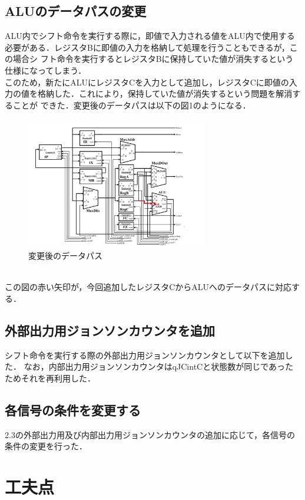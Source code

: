 \documentclass[dvipdfmx]{jarticle}
\begin{document}
\subsection{ALUのデータパスの変更}
ALU内でシフト命令を実行する際に，即値で入力される値をALU内で使用する必要がある．レジスタBに即値の入力を格納して処理を行うこともできるが，この場合シ
フト命令を実行するとレジスタBに保持していた値が消失するという仕様になってしまう．\\
このため，新たにALUにレジスタCを入力として追加し，レジスタCに即値の入力の値を格納した．これにより，保持していた値が消失するという問題を解消することが
できた．変更後のデータパスは以下の図1のようになる．
\begin{figure}[h]
  \centering
  \includegraphics[width = 8cm]{improvedatapath.png}
  \caption{変更後のデータパス}
\end{figure}
\\この図の赤い矢印が，今回追加したレジスタCからALUへのデータパスに対応する．
\subsection{外部出力用ジョンソンカウンタを追加}
シフト命令を実行する際の外部出力用ジョンソンカウンタとして以下を追加した．
なお，内部出力用ジョンソンカウンタはqJCintCと状態数が同じであったためそれを再利用した．
\subsection{各信号の条件を変更する}
2.3の外部出力用及び内部出力用ジョンソンカウンタの追加に応じて，各信号の条件の変更を行った．
\section{工夫点}
\end{document}

